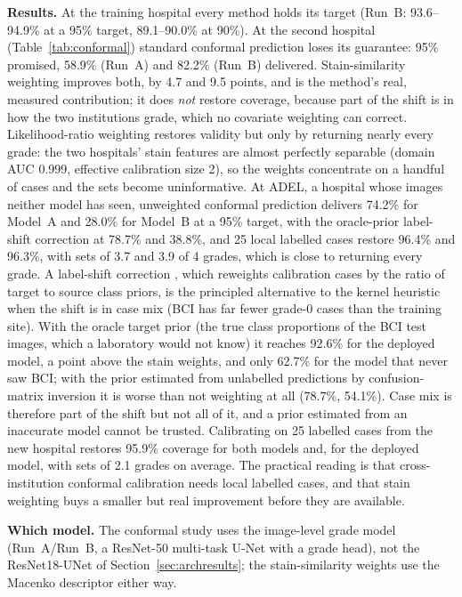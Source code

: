 \documentclass[conference]{IEEEtran}
\begin{document}
\textbf{Results.} At the training hospital every method holds its target
(Run~B: 93.6--94.9\% at a 95\% target, 89.1--90.0\% at 90\%). At the second
hospital (Table~\ref{tab:conformal}) standard conformal prediction loses its
guarantee: 95\% promised, 58.9\% (Run~A) and 82.2\% (Run~B) delivered.
Stain-similarity weighting improves both, by 4.7 and 9.5 points, and is the
method's real, measured contribution; it does \emph{not} restore coverage,
because part of the shift is in how the two institutions grade, which no
covariate weighting can correct. Likelihood-ratio weighting restores validity
but only by returning nearly every grade: the two hospitals' stain features are
almost perfectly separable (domain AUC 0.999, effective calibration size 2), so
the weights concentrate on a handful of cases and the sets become uninformative.
At ADEL, a hospital whose images neither model has seen, unweighted conformal prediction delivers 74.2\% for Model~A and 28.0\% for Model~B at a 95\% target, with the oracle-prior label-shift correction at 78.7\% and 38.8\%,
and 25 local labelled cases restore 96.4\% and 96.3\%, with sets of 3.7 and 3.9 of 4 grades, which is close to returning every grade. A label-shift correction \cite{podkopaev2021}, which reweights calibration cases by the ratio of target to source class priors, is the principled
alternative to the kernel heuristic when the shift is in case mix (BCI has far fewer grade-0 cases than the training site). With the oracle target prior
(the true class proportions of the BCI test images, which a laboratory would not know) it reaches 92.6\% for the deployed model, a point above the stain weights, and
only 62.7\% for the model that never saw BCI; with the prior estimated from unlabelled predictions by confusion-matrix inversion it is worse than not weighting at all (78.7\%, 54.1\%).
Case mix is therefore part of the shift but not all of it, and a prior estimated from an inaccurate model cannot be trusted.
Calibrating on 25 labelled cases from the new hospital restores 95.9\%
coverage for both models and, for the deployed model, with sets of 2.1 grades on
average. The practical reading is that cross-institution conformal calibration
needs local labelled cases, and that stain weighting buys a smaller but real
improvement before they are available.

\textbf{Which model.} The conformal study uses the image-level grade model (Run~A/Run~B, a ResNet-50 multi-task U-Net with a grade head), not the
ResNet18-UNet of Section~\ref{sec:archresults}; the stain-similarity weights use the Macenko descriptor either way.
\end{document}
